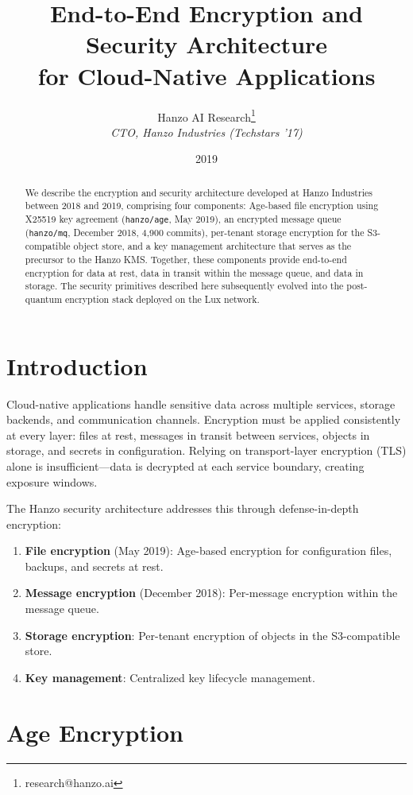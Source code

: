 \documentclass[11pt,a4paper]{article}
\title{End-to-End Encryption and Security Architecture\\for Cloud-Native Applications}
\author{Hanzo AI Research\thanks{research@hanzo.ai} \\ \textit{CTO, Hanzo Industries (Techstars '17)}}
\date{2019}
\begin{document}
\hanzocoverpage

\begin{abstract}
We describe the encryption and security architecture developed at Hanzo Industries between 2018 and 2019, comprising four components: Age-based file encryption using X25519 key agreement (\texttt{hanzo/age}, May 2019), an encrypted message queue (\texttt{hanzo/mq}, December 2018, 4{,}900 commits), per-tenant storage encryption for the S3-compatible object store, and a key management architecture that serves as the precursor to the Hanzo KMS. Together, these components provide end-to-end encryption for data at rest, data in transit within the message queue, and data in storage. The security primitives described here subsequently evolved into the post-quantum encryption stack deployed on the Lux network.
\end{abstract}

\section{Introduction}

Cloud-native applications handle sensitive data across multiple services, storage backends, and communication channels. Encryption must be applied consistently at every layer: files at rest, messages in transit between services, objects in storage, and secrets in configuration. Relying on transport-layer encryption (TLS) alone is insufficient---data is decrypted at each service boundary, creating exposure windows.

The Hanzo security architecture addresses this through defense-in-depth encryption:

\begin{enumerate}
    \item \textbf{File encryption} (May 2019): Age-based encryption for configuration files, backups, and secrets at rest.
    \item \textbf{Message encryption} (December 2018): Per-message encryption within the message queue.
    \item \textbf{Storage encryption}: Per-tenant encryption of objects in the S3-compatible store.
    \item \textbf{Key management}: Centralized key lifecycle management.
\end{enumerate}

\section{Age Encryption}
\end{document}
